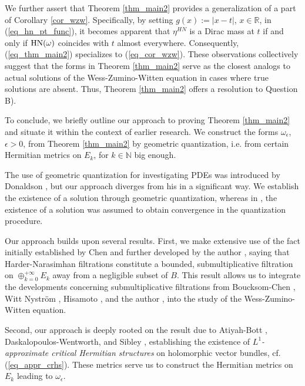 \documentclass[12pt]{article}
\numberwithin{equation}{section}
\theoremstyle{theorem}
\theoremstyle{definition}
\theoremstyle{remark}
\newcommand{\real}{\mathbb{R}}
\newcommand{\nat}{\mathbb{N}}
\begin{document}
	\par 
	We further assert that Theorem \ref{thm_main2} provides a generalization of a part of Corollary \ref{cor_wzw}. Specifically, by setting $g(x) := |x - t|$, $x \in \real$, in (\ref{eq_hn_pt_func}), it becomes apparent that $\eta^{HN}$ is a Dirac mass at $t$ if and only if ${\rm{HN}}(\omega)$ coincides with $t$ almost everywhere. 
	Consequently, (\ref{eq_thm_main2}) specializes to (\ref{eq_cor_wzw}). 
	These observations collectively suggest that the forms in Theorem \ref{thm_main2} serve as the closest analogs to actual solutions of the Wess-Zumino-Witten equation in cases where true solutions are absent. 
	Thus, Theorem \ref{thm_main2} offers a resolution to Question B).
	\par 
	To conclude, we briefly outline our approach to proving Theorem \ref{thm_main2} and situate it within the context of earlier research. 
	We construct the forms $\omega_{\epsilon}$, $\epsilon > 0$, from Theorem \ref{thm_main2} by geometric quantization, i.e. from certain Hermitian metrics on $E_k$, for $k \in \nat$ big enough.
	\par 
	The use of geometric quantization for investigating PDEs was introduced by Donaldson \cite{DonaldScalBalan}, but our approach diverges from his in a significant way. 
	We establish the existence of a solution through geometric quantization, whereas in \cite{DonaldScalBalan}, the existence of a solution was assumed to obtain convergence in the quantization procedure. 
	\par 
	Our approach builds upon several results.
	First, we make extensive use of the fact initially established by Chen \cite{ChenHNolyg} and further developed by the author \cite{FinHNI}, saying that Harder-Narasimhan filtrations constitute a bounded, submultiplicative filtration on $\oplus_{k = 0}^{+\infty} E_k$ away from a negligible subset of $B$. 
	This result allows us to integrate the developments concerning submultiplicative filtrations from Boucksom-Chen \cite{BouckChen}, Witt Nystr{\"o}m \cite{NystOkounTest}, Hisamoto \cite{HisamSpecMeas}, and the author \cite{FinTits}, \cite{FinSubmToepl} into the study of the Wess-Zumino-Witten equation.
	\par 
	Second, our approach is deeply rooted on the result due to Atiyah-Bott \cite{AtiyahBott}, Daskalopoulos-Wentworth, \cite{DaskWent} and Sibley \cite{SibleyYangMills}, establishing the existence of \textit{$L^1$-approximate critical Hermitian structures} on holomorphic vector bundles, cf. (\ref{eq_appr_crhs}).
	These metrics serve us to construct the Hermitian metrics on $E_k$ leading to $\omega_{\epsilon}$.
\end{document}
